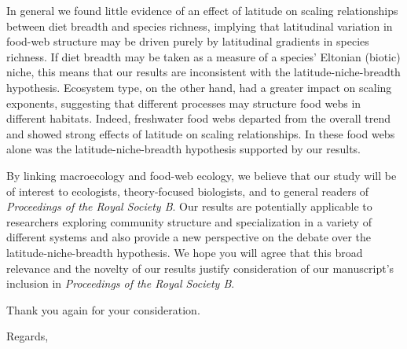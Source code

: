 \documentclass[12pt]{letter}
\newcommand{\myjournal}{\emph{Proceedings of the Royal Society B}}
\begin{document}
\begin{letter}
In general we found little evidence of an effect of latitude on scaling
relationships between diet breadth and species richness, implying that
latitudinal variation in food-web structure may be driven purely by
latitudinal gradients in species richness. If diet breadth may be taken as a
measure of a species' Eltonian (biotic) niche, this means that our results are
inconsistent with the latitude-niche-breadth hypothesis. Ecosystem type, on
the other hand, had a greater impact on scaling exponents, suggesting that
different processes may structure food webs in different habitats. Indeed,
freshwater food webs departed from the overall trend and showed strong effects
of latitude on scaling relationships. In these food webs alone was the
latitude-niche-breadth hypothesis supported by our results.



By linking macroecology and food-web ecology, we believe that our study will
be of interest to ecologists, theory-focused biologists, and to general
readers of \emph{\myjournal}. Our results are potentially applicable to
researchers exploring community structure and specialization in a variety of
different systems and also provide a new perspective on the debate over the
latitude-niche-breadth hypothesis. We hope you will agree that this broad
relevance and the novelty of our results justify consideration of our
manuscript's inclusion in \emph{\myjournal}.


Thank you again for your consideration.

\closing{Regards,}


\end{letter}


\end{document}

